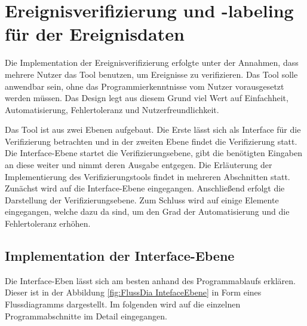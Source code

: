 \section{Ereignisverifizierung und -labeling für der Ereignisdaten}
Die Implementation der Ereignisverifizierung erfolgte unter der Annahmen, dass mehrere Nutzer das Tool benutzen, um Ereignisse zu verifizieren. Das Tool solle anwendbar sein, ohne das Programmierkenntnisse vom Nutzer vorausgesetzt werden müssen. Das Design legt aus diesem Grund viel Wert auf Einfachheit, Automatisierung, Fehlertoleranz und Nutzerfreundlichkeit. \par

Das Tool ist aus zwei Ebenen aufgebaut. Die Erste lässt sich als Interface für die Verifizierung betrachten und in der zweiten Ebene findet die Verifizierung statt. Die Interface-Ebene startet die Verifizierungsebene, gibt die benötigten Eingaben an diese weiter und nimmt deren Ausgabe entgegen. Die Erläuterung der Implementierung des Verifizierungstools findet in mehreren Abschnitten statt. Zunächst wird auf die Interface-Ebene eingegangen. Anschließend erfolgt die Darstellung der Verifizierungsebene. Zum Schluss wird auf einige Elemente eingegangen, welche dazu da sind, um den Grad der Automatisierung und die Fehlertoleranz erhöhen. 

\subsection{Implementation der Interface-Ebene} \label{sec:Umsetz VeriInterfaceEbene}
Die Interface-Eben lässt sich am besten anhand des Programmablaufs erklären. Dieser ist in der Abbildung \ref{fig:FlussDia IntefaceEbene} in Form eines Flussdiagramms dargestellt. Im folgenden wird auf die einzelnen Programmabschnitte im Detail eingegangen. 

